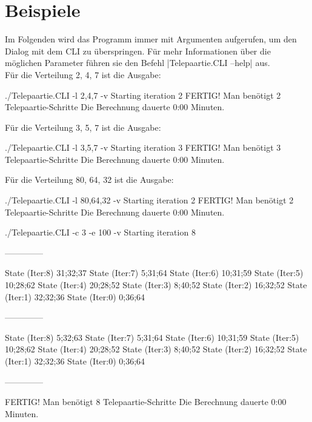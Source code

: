 \documentclass[a4paper,10pt,ngerman]{scrartcl}
\begin{document}
\section{Beispiele}
Im Folgenden wird das Programm immer mit Argumenten aufgerufen, um den Dialog mit dem CLI zu überspringen. Für mehr Informationen über die möglichen Parameter führen sie den Befehl |Telepaartie.CLI --help| aus.\\
\vspace{0.5cm}
Für die Verteilung 2, 4, 7 ist die Ausgabe:
\begin{lstcs}
./Telepaartie.CLI -l 2,4,7 -v
Starting iteration 2
FERTIG!
Man benötigt 2 Telepaartie-Schritte
Die Berechnung dauerte 0:00 Minuten.
\end{lstcs}
Für die Verteilung 3, 5, 7 ist die Ausgabe:
\begin{lstcs}
./Telepaartie.CLI -l 3,5,7 -v
Starting iteration 3
FERTIG!
Man benötigt 3 Telepaartie-Schritte
Die Berechnung dauerte 0:00 Minuten.
\end{lstcs}
Für die Verteilung 80, 64, 32 ist die Ausgabe:
\begin{lstcs}
./Telepaartie.CLI -l 80,64,32 -v
Starting iteration 2
FERTIG!
Man benötigt 2 Telepaartie-Schritte
Die Berechnung dauerte 0:00 Minuten.
\end{lstcs}
\begin{lstcs}
./Telepaartie.CLI -c 3 -e 100 -v
Starting iteration 8

--------------

State (Iter:8) {31;32;37}
State (Iter:7) {5;31;64}
State (Iter:6) {10;31;59}
State (Iter:5) {10;28;62}
State (Iter:4) {20;28;52}
State (Iter:3) {8;40;52}
State (Iter:2) {16;32;52}
State (Iter:1) {32;32;36}
State (Iter:0) {0;36;64}

--------------

State (Iter:8) {5;32;63}
State (Iter:7) {5;31;64}
State (Iter:6) {10;31;59}
State (Iter:5) {10;28;62}
State (Iter:4) {20;28;52}
State (Iter:3) {8;40;52}
State (Iter:2) {16;32;52}
State (Iter:1) {32;32;36}
State (Iter:0) {0;36;64}

--------------


FERTIG!
Man benötigt 8 Telepaartie-Schritte
Die Berechnung dauerte 0:00 Minuten.
\end{lstcs}
\end{document}
